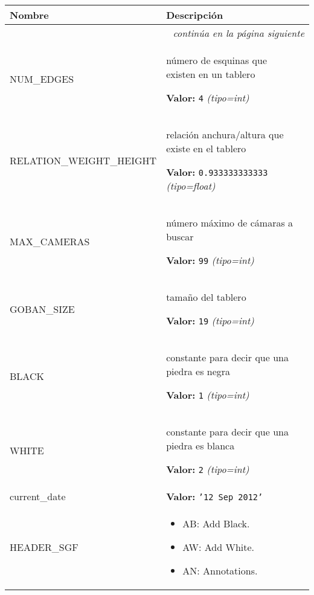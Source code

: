     \vspace{-1cm}
\hspace{\varindent}\begin{longtable}{|p{\varnamewidth}|p{\vardescrwidth}|l}
\cline{1-2}
\cline{1-2} \centering \textbf{Nombre} & \centering \textbf{Descripción}& \\
\cline{1-2}
\endhead\cline{1-2}\multicolumn{3}{r}{\small\textit{continúa en la página siguiente}}\\\endfoot\cline{1-2}
\endlastfoot\raggedright N\-U\-M\-\_\-E\-D\-G\-E\-S\- & \raggedright número de esquinas que existen en un tablero

\textbf{Valor:} 
{\tt 4}            {\it (tipo=int)}&\\
\cline{1-2}
\raggedright R\-E\-L\-A\-T\-I\-O\-N\-\_\-W\-E\-I\-G\-H\-T\-\_\-H\-E\-I\-G\-H\-T\- & \raggedright relación anchura/altura que existe en el tablero

\textbf{Valor:} 
{\tt 0.933333333333}            {\it (tipo=float)}&\\
\cline{1-2}
\raggedright M\-A\-X\-\_\-C\-A\-M\-E\-R\-A\-S\- & \raggedright número máximo de cámaras a buscar

\textbf{Valor:} 
{\tt 99}            {\it (tipo=int)}&\\
\cline{1-2}
\raggedright G\-O\-B\-A\-N\-\_\-S\-I\-Z\-E\- & \raggedright tamaño del tablero

\textbf{Valor:} 
{\tt 19}            {\it (tipo=int)}&\\
\cline{1-2}
\raggedright B\-L\-A\-C\-K\- & \raggedright constante para decir que una piedra es negra

\textbf{Valor:} 
{\tt 1}            {\it (tipo=int)}&\\
\cline{1-2}
\raggedright W\-H\-I\-T\-E\- & \raggedright constante para decir que una piedra es blanca

\textbf{Valor:} 
{\tt 2}            {\it (tipo=int)}&\\
\cline{1-2}
\raggedright c\-u\-r\-r\-e\-n\-t\-\_\-d\-a\-t\-e\- & \raggedright \textbf{Valor:} 
{\tt \texttt{'}\texttt{12 Sep 2012}\texttt{'}}&\\
\cline{1-2}
\raggedright H\-E\-A\-D\-E\-R\-\_\-S\-G\-F\- & \raggedright %
\begin{itemize}

\item AB: Add Black.

\item AW: Add White.

\item AN: Annotations.


\end{itemize}
\end{longtable}
